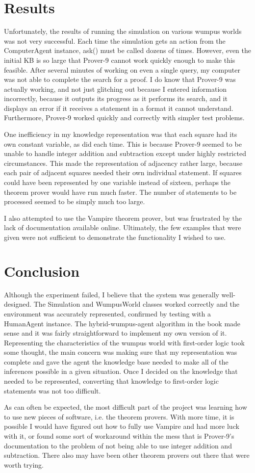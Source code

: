 \documentclass[10 pt.]{article}
\begin{document}
\section{Results}
Unfortunately, the results of running the simulation on various wumpus worlds
was not very successful. Each time the simulation gets an action from the
ComputerAgent instance, ask() must be called dozens of times. However, even the
initial KB is so large that Prover-9 cannot work quickly enough to make this
feasible. After several minutes of working on even a single query, my computer
was not able to complete the search for a proof. I do know that Prover-9 was
actually working, and not just glitching out because I entered information
incorrectly, because it outputs its progress as it performs its search, and it
displays an error if it receives a statement in a format it cannot understand.
Furthermore, Prover-9 worked quickly and correctly with simpler test problems.

One inefficiency in my knowledge representation was that each square had its
own constant variable, as did each time. This is because Prover-9 seemed to be
unable to handle integer addition and subtraction except under highly
restricted circumstances. This made the representation of adjacency rather
large, because each pair of adjacent squares needed their own individual
statement. If squares could have been represented by one variable instead of
sixteen, perhaps the theorem prover would have run much faster. The number of
statements to be processed seemed to be simply much too large.

I also attempted to use the Vampire theorem prover, but was frustrated by the
lack of documentation available online. Ultimately, the few examples that were
given were not sufficient to demonstrate the functionality I wished to use.

\section{Conclusion}
Although the experiment failed, I believe that the system was generally
well-designed. The Simulation and WumpusWorld classes worked correctly and the
environment was accurately represented, confirmed by testing
with a HumanAgent instance. The hybrid-wumpus-agent algorithm in the book
made sense and it was fairly straightforward to implement my own version of it.
Representing the characteristics of the wumpus
world with first-order logic took some thought, the
main concern was making sure that my representation was complete and gave the
agent the knowledge base needed to make all of the inferences possible in a
given situation. Once I decided on the knowledge that needed to be represented,
converting that knowledge to first-order logic statements was not too difficult.

As can often be expected, the most difficult part of the project was learning
how to use new pieces of software, i.e. the theorem provers. With more time, it is
possible I would have figured out how to fully use Vampire and had more luck
with it, or found some sort of workaround within the mess that is Prover-9's
documentation to the problem of not being able to use integer addition and
subtraction. There also may have been other theorem provers out there that
were worth trying.
\end{document}
